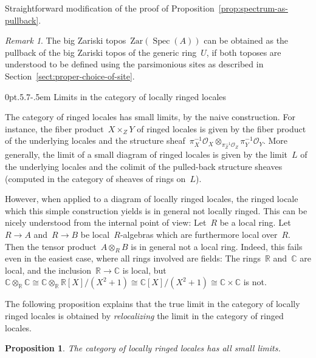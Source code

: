 \documentclass[10pt,reqno,a4paper]{amsbook}
\makeatletter
\theoremstyle{definition}
\theoremstyle{plain}
\newtheorem{prop}[defn]{Proposition}
\theoremstyle{remark}
\newtheorem{rem}[defn]{Remark}
\renewcommand{\O}{\mathcal{O}}
\newcommand{\RR}{\mathbb{R}}
\newcommand{\CC}{\mathbb{C}}
\newcommand{\Zar}{\mathrm{Zar}}
\DeclareMathOperator{\Spec}{Spec}
\newcommand{\?}{\,{:}\,}
\renewcommand{\_}{\mathpunct{.}\,}
\renewenvironment{proof}[1][\proofname]{\par
  \pushQED{\qed}%
  \normalfont \topsep6\p@\@plus6\p@\relax
  \trivlist
  \item[\hskip\labelsep
        \itshape
    #1\@addpunct{.}]\ignorespaces
}{%
  \popQED\endtrivlist\@endpefalse
}
\def\subsection{\@startsection{subsection}{2}%
  {0pt}{.5\linespacing\@plus.7\linespacing}{-.5em}%
  {\normalfont\bfseries}}
\makeatother
\begin{document}
\begin{proof}Straightforward modification of the proof of
Proposition~\ref{prop:spectrum-as-pullback}.
\end{proof}

\begin{rem}The big Zariski topos~$\Zar(\Spec(A))$ can be obtained as the
pullback of the big Zariski topos of the generic ring~$U$, if both toposes
are understood to be defined using the parsimonious sites as described in
Section~\ref{sect:proper-choice-of-site}.
\end{rem}


\subsection{Limits in the category of locally ringed locales}

The category of ringed locales has small limits, by the naive construction. For
instance, the fiber product~$X \times_Z Y$ of ringed locales is given by the
fiber product of the underlying locales and the
structure sheaf~$\pi_X^{-1}\O_X \otimes_{\pi_Z^{-1}\O_Z} \pi_Y^{-1}\O_Y$. More
generally, the limit of a small diagram of ringed locales is given by the limit~$L$
of the underlying locales and the colimit of the pulled-back structure sheaves
(computed in the category of sheaves of rings on~$L$).

However, when applied to a diagram of locally ringed locales, the ringed locale
which this simple construction yields is in general not locally ringed. This
can be nicely understood from the internal point of view: Let~$R$ be a local
ring. Let~$R \to A$ and~$R \to B$ be local~$R$-algebras which are furthermore
local over~$R$. Then the tensor product~$A \otimes_R B$ is in general not a
local ring. Indeed, this fails even in the easiest case, where all rings
involved are fields: The rings~$\RR$ and~$\CC$ are local, and the
inclusion~$\RR \to \CC$ is local, but~$\CC \otimes_\RR \CC \cong \CC
\otimes_\RR \RR[X]/(X^2+1) \cong \CC[X]/(X^2+1) \cong \CC \times
\CC$ is not.

The following proposition explains that the true limit in the category of
locally ringed locales is obtained by \emph{relocalizing} the limit in the
category of ringed locales.

\begin{prop}\label{prop:lrl-complete}
The category of locally ringed locales has all small limits.
\end{prop}
\end{document}
